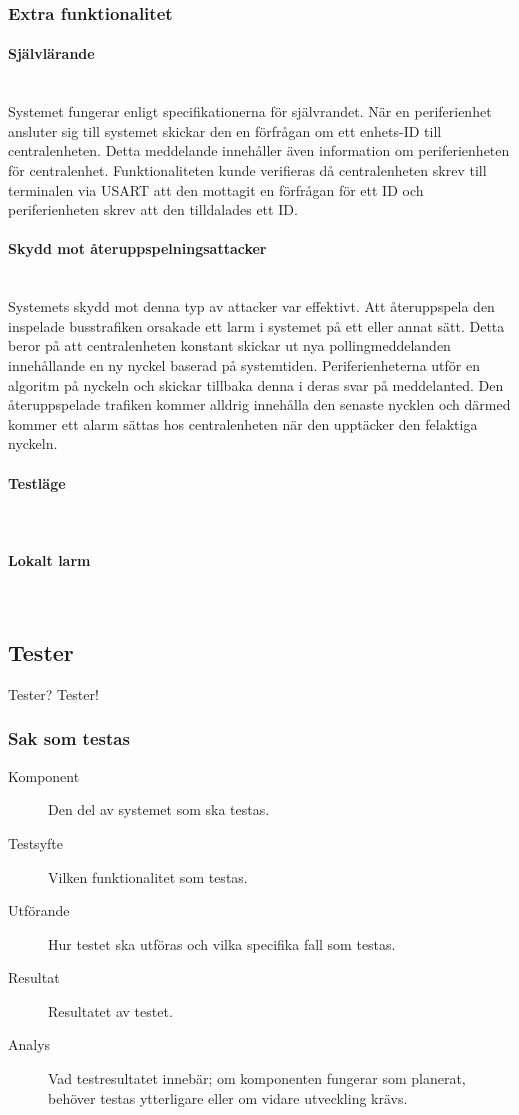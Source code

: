 \documentclass[a4paper]{article}
\newcommand{\subsubsubsection}[1]{\paragraph{#1}\mbox{}\\}
\begin{document}
\subsubsection{Extra funktionalitet}
\subsubsubsection{Självlärande}
Systemet fungerar enligt specifikationerna för självrandet. 
När en periferienhet ansluter sig till systemet skickar den en förfrågan om ett enhets-ID till centralenheten.
Detta meddelande innehåller även information om periferienheten för centralenhet.
Funktionaliteten kunde verifieras då centralenheten skrev till terminalen via USART att den mottagit en förfrågan för ett ID och periferienheten skrev att den tilldalades ett ID.
\subsubsubsection{Skydd mot återuppspelningsattacker}
Systemets skydd mot denna typ av attacker var effektivt. 
Att återuppspela den inspelade busstrafiken orsakade ett larm i systemet på ett eller annat sätt. 
Detta beror på att centralenheten konstant skickar ut nya pollingmeddelanden innehållande en ny nyckel baserad på systemtiden. 
Periferienheterna utför en algoritm på nyckeln och skickar tillbaka denna i deras svar på meddelanted.
Den återuppspelade trafiken kommer alldrig innehålla den senaste nycklen och därmed kommer ett alarm sättas hos centralenheten när den upptäcker den felaktiga nyckeln. 

\subsubsubsection{Testläge}
\subsubsubsection{Lokalt larm}

\subsection{Tester}
Tester? Tester!

\subsubsection{Sak som testas}
\begin{description}
\item[Komponent] Den del av systemet som ska testas.

\item[Testsyfte] Vilken funktionalitet som testas.

\item[Utförande] Hur testet ska utföras och vilka specifika fall som testas.

\item[Resultat] Resultatet av testet.

\item[Analys] Vad testresultatet innebär; om komponenten fungerar som planerat, behöver testas ytterligare eller om vidare utveckling krävs.
\end{description}
\end{document}
